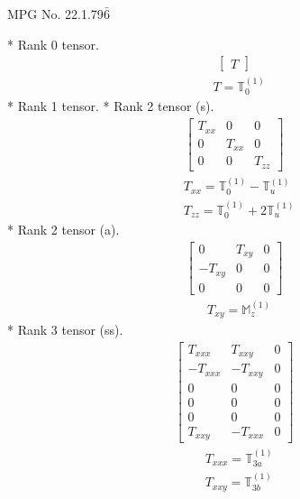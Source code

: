 \documentclass[fleqn,8pt,landscape]{jsarticle}
\begin{document}
\setcounter{MaxMatrixCols}{32}

\renewcommand{\tablename}{Table~}
\renewcommand{\figurename}{Figure~}
\begin{center}
\LARGE
MPG No. 22.1.79\quad$\bar{6}$
\end{center}
* Rank 0 tensor.
\begin{align*}
\begin{bmatrix} T \end{bmatrix}
\end{align*}
\begin{align*}
& T = \mathbb{T}_{0}^{(1)}
\end{align*}
* Rank 1 tensor.
* Rank 2 tensor (s).
\begin{align*}
\begin{bmatrix} T_{xx} & 0 & 0 \\ 0 & T_{xx} & 0 \\ 0 & 0 & T_{zz} \end{bmatrix}
\end{align*}
\begin{align*}
& T_{xx} = \mathbb{T}_{0}^{(1)} - \mathbb{T}_{u}^{(1)} \\
& T_{zz} = \mathbb{T}_{0}^{(1)} + 2 \mathbb{T}_{u}^{(1)}
\end{align*}
* Rank 2 tensor (a).
\begin{align*}
\begin{bmatrix} 0 & T_{xy} & 0 \\ - T_{xy} & 0 & 0 \\ 0 & 0 & 0 \end{bmatrix}
\end{align*}
\begin{align*}
& T_{xy} = \mathbb{M}_{z}^{(1)}
\end{align*}
* Rank 3 tensor (ss).
\begin{align*}
\begin{bmatrix} T_{xxx} & T_{xxy} & 0 \\ - T_{xxx} & - T_{xxy} & 0 \\ 0 & 0 & 0 \\ 0 & 0 & 0 \\ 0 & 0 & 0 \\ T_{xxy} & - T_{xxx} & 0 \end{bmatrix}
\end{align*}
\begin{align*}
& T_{xxx} = \mathbb{T}_{3a}^{(1)} \\
& T_{xxy} = \mathbb{T}_{3b}^{(1)}
\end{align*}
\end{document}
